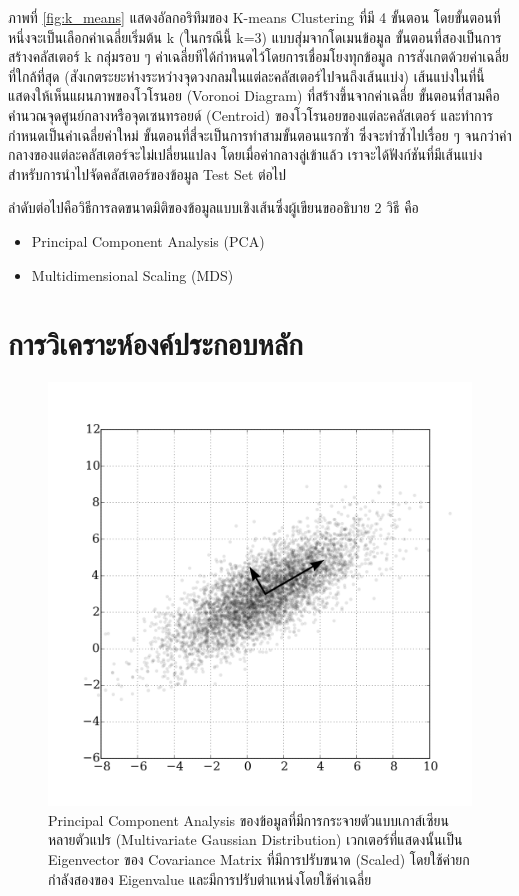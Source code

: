 ภาพที่ \ref{fig:k_means} แสดงอัลกอริทึมของ K-means Clustering ที่มี 4 ขั้นตอน โดยขั้นตอนที่หนึ่งจะเป็นเลือกค่าเฉลี่ยเริ่มต้น k 
(ในกรณีนี้ k=3) แบบสุ่มจากโดเมนข้อมูล ขั้นตอนที่สองเป็นการสร้างคลัสเตอร์ k กลุ่มรอบ ๆ ค่าเฉลี่ยทีได้กำหนดไว้โดยการเชื่อมโยงทุกข้อมูล%
การสังเกตด้วยค่าเฉลี่ยที่ใกล้ที่สุด (สังเกตระยะห่างระหว่างจุดวงกลมในแต่ละคลัสเตอร์ไปจนถึงเส้นแบ่ง) เส้นแบ่งในที่นี้แสดงให้เห็นแผนภาพของโวโรนอย 
(Voronoi Diagram) ที่สร้างขึ้นจากค่าเฉลี่ย ขั้นตอนที่สามคือคำนวณจุดศูนย์กลางหรือจุดเซนทรอยด์ (Centroid) ของโวโรนอยของแต่ละคลัสเตอร์%
และทำการกำหนดเป็นค่าเฉลี่ยค่าใหม่ ขั้นตอนที่สี่จะเป็นการทำสามขั้นตอนแรกซ้ำ ซึ่งจะทำซ้ำไปเรื่อย ๆ จนกว่าค่ากลางของแต่ละคลัสเตอร์จะไม่เปลี่ยนแปลง
โดยเมื่อค่ากลางลู่เข้าแล้ว เราจะได้ฟังก์ชันที่มีเส้นแบ่งสำหรับการนำไปจัดคลัสเตอร์ของข้อมูล Test Set ต่อไป

ลำดับต่อไปคือวิธีการลดขนาดมิติของข้อมูลแบบเชิงเส้นซึ่งผู้เขียนขออธิบาย 2 วิธี คือ

\begin{itemize}
    \item Principal Component Analysis (PCA)
    \item Multidimensional Scaling (MDS)
\end{itemize}

\section{การวิเคราะห์องค์ประกอบหลัก}
\label{sec:pca}

\begin{figure}[H]
    \centering
    \includegraphics[width=0.8\linewidth]{fig/pca.png}
    \caption{Principal Component Analysis ของข้อมูลที่มีการกระจายตัวแบบเกาส์เซียนหลายตัวแปร (Multivariate Gaussian
    Distribution) เวกเตอร์ที่แสดงนั้นเป็น Eigenvector ของ Covariance Matrix ที่มีการปรับขนาด (Scaled) โดยใช้ค่ายกกำลังสองของ 
    Eigenvalue และมีการปรับตำแหน่งโดยใช้ค่าเฉลี่ย}
    \label{fig:pca}
\end{figure}

